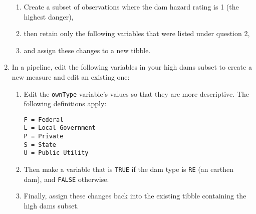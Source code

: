 \documentclass{tufte-handout}
\begin{document}
\begin{enumerate}
\begin{enumerate}
\item Create a subset of observations where the dam hazard rating is 1 (the highest danger), 
\item then retain only the following variables that were listed under question 2,
\item and assign these changes to a new tibble.
\end{enumerate}
\item In a pipeline, edit the following variables in your high dams subset to create a new measure and edit an existing one:
\begin{enumerate}
\item Edit the \texttt{ownType} variable's values so that they are more descriptive. The following definitions apply:
\begin{verbatim}
F = Federal
L = Local Government
P = Private
S = State
U = Public Utility
\end{verbatim}
\item Then make a variable that is \texttt{TRUE} if the dam type is \texttt{RE} (an earthen dam), and \texttt{FALSE} otherwise.
\item Finally, assign these changes back into the existing tibble containing the high dams subset.
\end{enumerate}
\end{enumerate}

\vspace{5mm}
\end{document}
